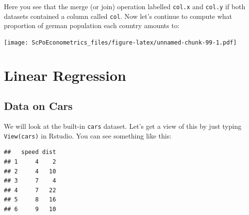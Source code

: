 \documentclass[]{book}
\newenvironment{Shaded}{\begin{snugshade}}{\end{snugshade}}
\newcommand{\KeywordTok}[1]{\textcolor[rgb]{0.13,0.29,0.53}{\textbf{#1}}}
\newcommand{\DataTypeTok}[1]{\textcolor[rgb]{0.13,0.29,0.53}{#1}}
\newcommand{\DecValTok}[1]{\textcolor[rgb]{0.00,0.00,0.81}{#1}}
\newcommand{\StringTok}[1]{\textcolor[rgb]{0.31,0.60,0.02}{#1}}
\newcommand{\CommentTok}[1]{\textcolor[rgb]{0.56,0.35,0.01}{\textit{#1}}}
\newcommand{\OperatorTok}[1]{\textcolor[rgb]{0.81,0.36,0.00}{\textbf{#1}}}
\newcommand{\NormalTok}[1]{#1}
\theoremstyle{definition}
\theoremstyle{definition}
\theoremstyle{definition}
\theoremstyle{remark}
\begin{document}
Here you see that the merge (or join) operation labelled \texttt{col.x}
and \texttt{col.y} if both datasets contained a column called
\texttt{col}. Now let's continue to compute what proportion of german
population each country amounts to:

\begin{Shaded}
\end{Shaded}

\texttt{[image: ScPoEconometrics\_files/figure-latex/unnamed-chunk-99-1.pdf]}

\chapter{Linear Regression}\label{linreg}

\section{Data on Cars}\label{data-on-cars}

We will look at the built-in \texttt{cars} dataset. Let's get a view of
this by just typing \texttt{View(cars)} in Rstudio. You can see
something like this:

\begin{verbatim}
##   speed dist
## 1     4    2
## 2     4   10
## 3     7    4
## 4     7   22
## 5     8   16
## 6     9   10
\end{verbatim}
\end{document}
